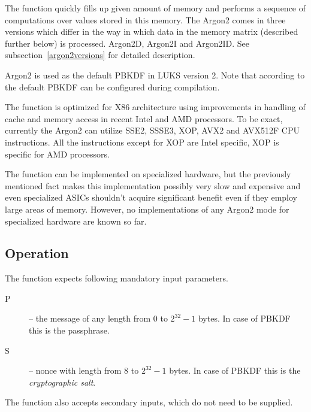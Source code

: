 \documentclass[nolof]{fithesis3}
\begin{document}
The function quickly fills up given amount of memory and performs a sequence of computations over values stored in this memory. The Argon2 comes in three versions which differ in the way in which data in the memory matrix (described further below) is processed. Argon2D, Argon2I and Argon2ID. See subsection~\ref{argon2versions} for detailed description.

Argon2 is used as the default PBKDF in LUKS version 2. Note that according to \parencite{cryptsetupmanual} the default PBKDF can be configured during compilation.

The function is optimized for X86 architecture using improvements in handling of cache and memory access in recent Intel and AMD processors. To be exact, currently the Argon2 can utilize SSE2, SSSE3, XOP, AVX2 and AVX512F CPU instructions. All the instructions except for XOP are Intel specific, XOP is specific for AMD processors.

The function can be implemented on specialized hardware, but the previously mentioned fact makes this implementation possibly very slow and expensive and even specialized ASICs shouldn't acquire significant benefit even if they employ large areas of memory. However, no implementations of any Argon2 mode for specialized hardware are known so far.

\subsection{Operation}
The function expects following mandatory input parameters.

\begin{description}
\item[P] -- the message of any length from 0 to \(2^{32} - 1\) bytes. In case of PBKDF this is the passphrase.

\item[S] -- nonce with length from 8 to \(2^{32} - 1\) bytes. In case of PBKDF this is the \emph{cryptographic salt}.
\end{description}

The function also accepts secondary inputs, which do not need to be supplied.
\end{document}
